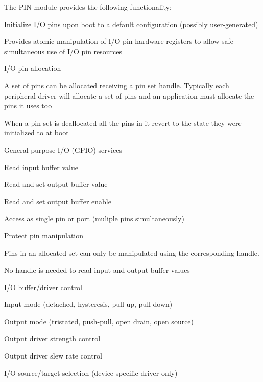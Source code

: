The P\-I\-N module provides the following functionality\-:
\begin{DoxyItemize}
\item Initialize I/\-O pins upon boot to a default configuration (possibly user-\/generated)
\item Provides atomic manipulation of I/\-O pin hardware registers to allow safe simultaneous use of I/\-O pin resources
\item I/\-O pin allocation
\begin{DoxyItemize}
\item A set of pins can be allocated receiving a pin set handle. Typically each peripheral driver will allocate a set of pins and an application must allocate the pins it uses too
\item When a pin set is deallocated all the pins in it revert to the state they were initialized to at boot
\end{DoxyItemize}
\item General-\/purpose I/\-O (G\-P\-I\-O) services
\begin{DoxyItemize}
\item Read input buffer value
\item Read and set output buffer value
\item Read and set output buffer enable
\item Access as single pin or port (muliple pins simultaneously)
\end{DoxyItemize}
\item Protect pin manipulation
\begin{DoxyItemize}
\item Pins in an allocated set can only be manipulated using the corresponding handle.
\item No handle is needed to read input and output buffer values
\end{DoxyItemize}
\item I/\-O buffer/driver control
\begin{DoxyItemize}
\item Input mode (detached, hysteresis, pull-\/up, pull-\/down)
\item Output mode (tristated, push-\/pull, open drain, open source)
\item Output driver strength control
\item Output driver slew rate control
\end{DoxyItemize}
\item I/\-O source/target selection (device-\/specific driver only)
\begin{DoxyItemize}

\end{DoxyItemize}
\end{DoxyItemize}

